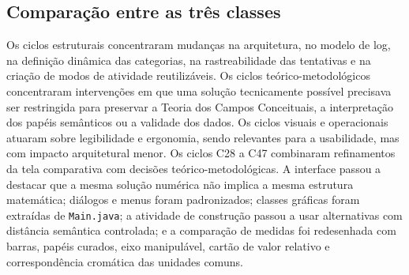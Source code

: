 \documentclass[preprint,12pt,authoryear]{elsarticle}
\begin{document}
\subsection{Comparação entre as três classes}
Os ciclos estruturais concentraram mudanças na arquitetura, no modelo de log, na definição dinâmica das categorias, na rastreabilidade das tentativas e na criação de modos de atividade reutilizáveis. Os ciclos teórico-metodológicos concentraram intervenções em que uma solução tecnicamente possível precisava ser restringida para preservar a Teoria dos Campos Conceituais, a interpretação dos papéis semânticos ou a validade dos dados. Os ciclos visuais e operacionais atuaram sobre legibilidade e ergonomia, sendo relevantes para a usabilidade, mas com impacto arquitetural menor.
Os ciclos C28 a C47 combinaram refinamentos da tela comparativa com decisões teórico-metodológicas. A interface passou a destacar que a mesma solução numérica não implica a mesma estrutura matemática; diálogos e menus foram padronizados; classes gráficas foram extraídas de \texttt{Main.java}; a atividade de construção passou a usar alternativas com distância semântica controlada; e a comparação de medidas foi redesenhada com barras, papéis curados, eixo manipulável, cartão de valor relativo e correspondência cromática das unidades comuns.
\end{document}
